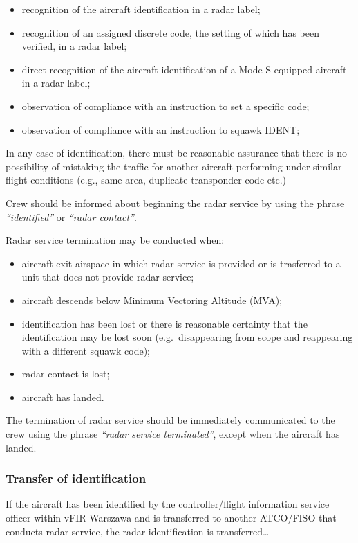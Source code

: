 \begin{itemize}
\item recognition of the aircraft identification in a radar label;
\item recognition of an assigned discrete code, the setting of which has been
verified, in a radar label;
\item direct recognition of the aircraft identification of a Mode S-equipped
aircraft in a radar label;
\item observation of compliance with an instruction to set a specific code;
\item observation of compliance with an instruction to squawk IDENT;\@
\end{itemize}

In any case of identification, there must be reasonable assurance that there is
no possibility of mistaking the traffic for another aircraft performing under
similar flight conditions (e.g., same area, duplicate transponder code etc.)

Crew should be informed about beginning the radar service by using the phrase
\textit{``identified''} or \textit{``radar contact''}.

Radar service termination may be conducted when:

\begin{itemize}
\item aircraft exit airspace in which radar service is provided or is trasferred
to a unit that does not provide radar service;
\item aircraft descends below Minimum Vectoring Altitude (MVA);
\item identification has been lost or there is reasonable certainty that the
identification may be lost soon (e.g.~disappearing from scope and reappearing
with a different squawk code);
\item radar contact is lost;
\item aircraft has landed.
\end{itemize}

The termination of radar service should be immediately communicated to the crew
using the phrase \textit{``radar service terminated''}, except when the aircraft
has landed.

\subsubsection{Transfer of identification}

If the aircraft has been identified by the controller/flight information service
officer within vFIR Warszawa and is transferred to another ATCO/FISO that
conducts radar service, the radar identification is transferred\dots

